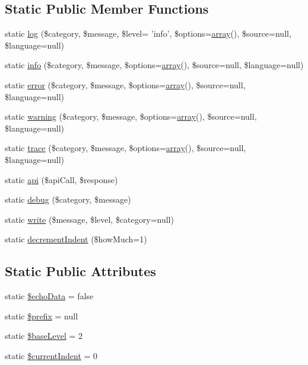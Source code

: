 \subsection*{Static Public Member Functions}
\begin{DoxyCompactItemize}
\item 
static \hyperlink{classCPSLog_a4c3be4120dc6dee2c97a6dde9428ac76}{log} (\$category, \$message, \$level= 'info', \$options=\hyperlink{list_8php_aa3205d038c7f8feb5c9f01ac4dfadc88}{array}(), \$source=null, \$language=null)
\item 
static \hyperlink{classCPSLog_a377d71c5d7e04b1098ec85533d165ec4}{info} (\$category, \$message, \$options=\hyperlink{list_8php_aa3205d038c7f8feb5c9f01ac4dfadc88}{array}(), \$source=null, \$language=null)
\item 
static \hyperlink{classCPSLog_a99034739d5e469b037364bf2f5694e11}{error} (\$category, \$message, \$options=\hyperlink{list_8php_aa3205d038c7f8feb5c9f01ac4dfadc88}{array}(), \$source=null, \$language=null)
\item 
static \hyperlink{classCPSLog_a53acb6b7750f2124585e95066e3c0682}{warning} (\$category, \$message, \$options=\hyperlink{list_8php_aa3205d038c7f8feb5c9f01ac4dfadc88}{array}(), \$source=null, \$language=null)
\item 
static \hyperlink{classCPSLog_ab8a624f93a0bfc699dd00c01af886955}{trace} (\$category, \$message, \$options=\hyperlink{list_8php_aa3205d038c7f8feb5c9f01ac4dfadc88}{array}(), \$source=null, \$language=null)
\item 
static \hyperlink{classCPSLog_acf48a217b13a2f1e5b5431b6113ae38b}{api} (\$apiCall, \$response)
\item 
static \hyperlink{classCPSLog_af84e351764728a15fc9c0d87e99deb5d}{debug} (\$category, \$message)
\item 
static \hyperlink{classCPSLog_a01cfe9b1c44f0c7a14c0f4ff7460e666}{write} (\$message, \$level, \$category=null)
\item 
static \hyperlink{classCPSLog_a155b35eda603d263e56ba06d3c3042f5}{decrementIndent} (\$howMuch=1)
\end{DoxyCompactItemize}
\subsection*{Static Public Attributes}
\begin{DoxyCompactItemize}
\item 
static \hyperlink{classCPSLog_aba01bbea42407ae9944e5b1247efeab2}{\$echoData} = false
\item 
static \hyperlink{classCPSLog_a09e8cf95b9d29955a0bfabca9b420edc}{\$prefix} = null
\item 
static \hyperlink{classCPSLog_a0e25dd3694766f9fb978bfc87d179189}{\$baseLevel} = 2
\item 
static \hyperlink{classCPSLog_ac08dfa5d5e776a071386c5aab064d0b2}{\$currentIndent} = 0
\end{DoxyCompactItemize}
